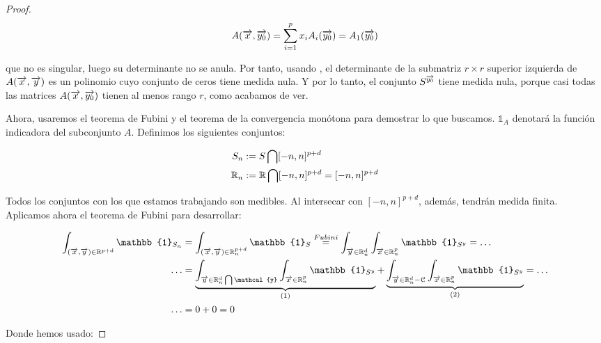 \begin{proof}
    \begin{equation}
        A(\overrightarrow{x}, \overrightarrow{y_0}) = \sum_{i = 1}^{p} x_i A_i(\overrightarrow{y_0}) = A_1(\overrightarrow{y_0})
    \end{equation}

    que no es singular, luego su determinante no se anula. Por tanto, usando , el determinante de la submatriz $r \times r$ superior izquierda de $A(\overrightarrow{x}, \overrightarrow{y})$ es un polinomio cuyo conjunto de ceros tiene medida nula. Y por lo tanto, el conjunto $S^{\overrightarrow{y_0}}$ tiene medida nula, porque casi todas las matrices $A(\overrightarrow{x}, \overrightarrow{y_0})$ tienen al menos rango $r$, como acabamos de ver.

    Ahora, usaremos el teorema de Fubini y el teorema de la convergencia monótona para demostrar lo que buscamos. $\mathbb{1}_A$ denotará la función indicadora del subconjunto $A$. Definimos los siguientes conjuntos:

    \begin{equation}
        \begin{split}
            S_n &:= S \bigcap [-n, n]^{p+d} \\
            \mathbb{R}_n &:= \mathbb{R} \bigcap [-n, n]^{p+d} = [-n, n]^{p+d}
        \end{split}
    \end{equation}

    Todos los conjuntos con los que estamos trabajando son medibles. Al intersecar con $[-n, n]^{p+d}$, además, tendrán medida finita. Aplicamos ahora el teorema de Fubini para desarrollar:

    \begin{equation}
        \begin{split}
            \int_{(\nv{x}, \nv{y}) \in \R^{p+d}} \mathbb{1}_{S_n} &= \int_{(\nv{x},\nv{y}) \in \R_n^{p+d}} \mathbb{1}_{S} \encima{=}{Fubini} \int_{\nv{y} \in \R_n^d} \int_{\nv{x} \in \R_n^p} \mathbb{1}_{S^y} = \ldots \\
            \ldots &= \comentardebajo{\int_{\nv{y} \in \R_n^d \interseccion \mathcal{y}} \int_{\nv{x} \in \R^p_n} \mathbb{1}_{S^y}}{(1)} + \comentardebajo{\int_{\nv{y} \in \R_n^d - \mathcal{C}} \int_{\nv{x} \in \R^p_n} \mathbb{1}_{S^y}}{(2)} = \ldots \\
            \ldots &= 0 + 0 = 0
        \end{split}
    \end{equation}

    Donde hemos usado:


\end{proof}
